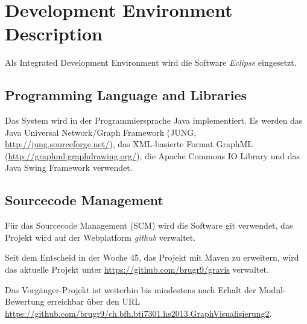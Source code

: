 \section{Development Environment Description}
\label{sec:Development Environment Description}
% 
Als Integrated Development Environment wird die Software \textit{Eclipse} eingesetzt.
% 
\subsection{Programming Language and Libraries}
\label{subsec:Programming Language and Libraries}
Das System wird in der Programmiersprache Java implementiert. Es werden das Java Universal Network/Graph Framework (JUNG, \url{http://jung.sourceforge.net/}), das XML-basierte Format GraphML (\url{http://graphml.graphdrawing.org/}), die Apache Commons IO Library und das Java Swing Framework verwendet.
% 
\subsection{Sourcecode Management}
\label{subsec:Sourcecode Management}
F\"ur das Sourcecode Management (SCM) wird die Software git verwendet, das Projekt wird auf der Webplatform \textit{github} verwaltet.

Seit dem Entscheid in der Woche 45, das Projekt mit Maven zu erweitern, wird das aktuelle Projekt unter \url{https://github.com/brugr9/gravis} verwaltet.

Das Vorg\"anger-Projekt ist weiterhin bis mindestens nach Erhalt der Modul-Bewertung erreichbar \"uber den URL \url{https://github.com/brugr9/ch.bfh.bti7301.hs2013.GraphVisualisierung2}.